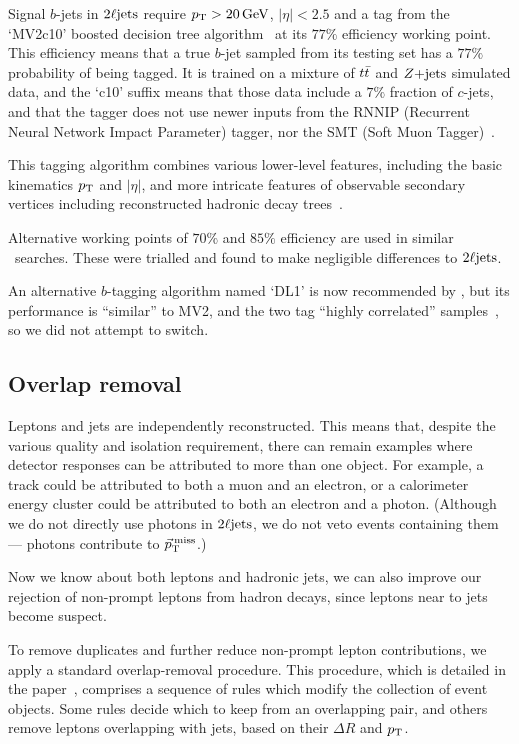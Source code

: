 Signal $b$-jets in $\twoljets$ require $\pt > 20\,\eV[G]$, $|\eta| < 2.5$ and a
tag from the `MV2c10' boosted decision tree
algorithm~\cite{
friedman2002stochastic,
atlas_jet_mv2c10_2017,
atlas_jet_tagging_2019
} at its $77\%$ efficiency working point.
This efficiency means that a true $b$-jet sampled from its testing set has a
$77\%$ probability of being tagged.
It is trained on a mixture of $\ttbar$ and $\zjets$ simulated data,
and the `c10' suffix means that those data include a $7\%$ fraction of
$c$-jets, and that the tagger does not use newer inputs from the
RNNIP (Recurrent Neural Network Impact Parameter) tagger, nor the
SMT (Soft Muon Tagger)~\cite{atlas_twiki_mv2, atlas_jet_mv2c10_2017}.

This tagging algorithm combines various lower-level features, including the
basic kinematics $\pt$ and $|\eta|$, and more intricate features of
observable secondary vertices including reconstructed hadronic decay
trees~\cite{atlas_jet_mv2c10_2017}.

Alternative working points of $70\%$ and $85\%$ efficiency are used in similar
\atlas\ searches.
These were trialled and found to make negligible differences to $\twoljets$.

An alternative $b$-tagging algorithm named `DL1' is now recommended by \atlas,
but its performance is ``similar'' to MV2, and the two tag
``highly correlated'' samples~\cite{atlas_jet_tagging_2019}, so we did not
attempt to switch.


\subsection{Overlap removal}
\label{sec:2ljets_overlap_removal}
Leptons and jets are independently reconstructed.
This means that, despite the various quality and isolation requirement, there
can remain examples where detector responses can be attributed to more than
one object.
For example, a track could be attributed to both a muon and an electron,
or a calorimeter energy cluster could be attributed to both an electron and a
photon. (Although we do not directly use photons in $\twoljets$, we do not veto
events containing them --- photons contribute to $\ptmiss$.)

Now we know about both leptons and hadronic jets, we can also improve our
rejection of non-prompt leptons from hadron decays, since leptons near to jets
become suspect.

To remove duplicates and further reduce non-prompt lepton contributions, we
apply a standard overlap-removal procedure.
This procedure, which is detailed in the paper~\cite{atlas2022searches},
comprises a sequence of rules which modify the collection of event objects.
Some rules decide which to keep from an overlapping pair,
and others remove leptons overlapping with jets, based on their $\Delta R$
and $\pt$.


